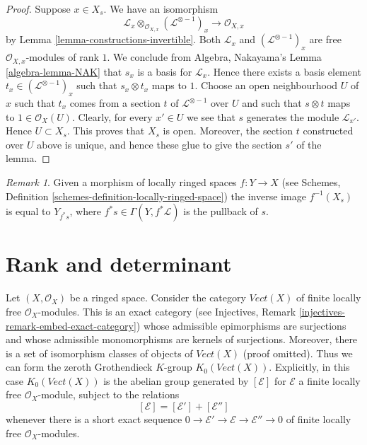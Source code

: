 \documentclass{stacks-project}
\theoremstyle{plain}
\theoremstyle{definition}
\theoremstyle{remark}
\newtheorem{remark}[subsection]{Remark}
\numberwithin{equation}{subsection}
\begin{document}
\begin{proof}
Suppose $x \in X_s$.
We have an isomorphism
$$
\mathcal{L}_x \otimes_{\mathcal{O}_{X, x}} (\mathcal{L}^{\otimes -1})_x
\longrightarrow
\mathcal{O}_{X, x}
$$
by Lemma \ref{lemma-constructions-invertible}.
Both $\mathcal{L}_x$ and $(\mathcal{L}^{\otimes -1})_x$
are free $\mathcal{O}_{X, x}$-modules of rank $1$. We conclude
from Algebra, Nakayama's Lemma \ref{algebra-lemma-NAK} that
$s_x$ is a basis for $\mathcal{L}_x$. Hence there exists
a basis element $t_x \in (\mathcal{L}^{\otimes -1})_x$
such that $s_x \otimes t_x$ maps to $1$.
Choose an open neighbourhood $U$ of
$x$ such that $t_x$ comes from a section $t$
of $\mathcal{L}^{\otimes -1}$ over $U$ and such that
$s \otimes t$ maps to $1 \in \mathcal{O}_X(U)$.
Clearly, for every $x' \in U$ we see that $s$ generates
the module $\mathcal{L}_{x'}$. Hence $U \subset X_s$.
This proves that $X_s$ is open. Moreover, the section
$t$ constructed over $U$ above is unique, and hence
these glue to give the section $s'$ of the lemma.
\end{proof}

\begin{remark}
\label{remark-pullback-s-open}
Given a morphism of locally ringed spaces $f : Y \to X$
(see Schemes, Definition \ref{schemes-definition-locally-ringed-space})
the inverse image $f^{-1}(X_s)$ is equal to $Y_{f^*s}$, where
$f^*s \in \Gamma(Y, f^*\mathcal{L})$ is the pullback of $s$.
\end{remark}


\section{Rank and determinant}
\label{section-rank-and-det}

\noindent
Let $(X, \mathcal{O}_X)$ be a ringed space. Consider the category
$\textit{Vect}(X)$ of finite locally free $\mathcal{O}_X$-modules.
This is an exact category
(see Injectives, Remark \ref{injectives-remark-embed-exact-category})
whose admissible epimorphisms are
surjections and whose admissible monomorphisms are kernels of
surjections. Moreover, there is a set of isomorphism classes
of objects of $\textit{Vect}(X)$ (proof omitted). Thus we can form
the zeroth Grothendieck $K$-group $K_0(\textit{Vect}(X))$.
Explicitly, in this case $K_0(\textit{Vect}(X))$
is the abelian group generated by $[\mathcal{E}]$ for $\mathcal{E}$
a finite locally free $\mathcal{O}_X$-module, subject to the relations
$$
[\mathcal{E}] = [\mathcal{E}'] + [\mathcal{E}'']
$$
whenever there is a short exact sequence
$0 \to \mathcal{E}' \to \mathcal{E} \to \mathcal{E}'' \to 0$
of finite locally free $\mathcal{O}_X$-modules.
\end{document}
